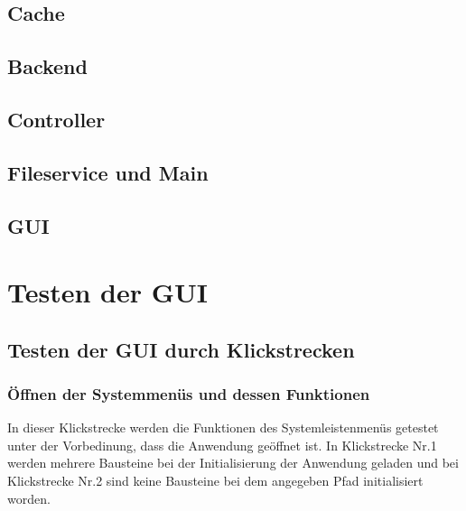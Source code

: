 \documentclass[parskip=full]{scrartcl}
\begin{document}
\subsection{Cache}
\subsection{Backend}
\subsection{Controller}
\subsection{Fileservice und Main}
\subsection{GUI}

\clearpage
\section{Testen der GUI} \label{gui}


\subsection{Testen der GUI durch Klickstrecken}

\subsubsection{Öffnen der Systemmenüs und dessen Funktionen}

In dieser Klickstrecke werden die Funktionen des Systemleistenmenüs getestet unter der Vorbedinung, dass die Anwendung geöffnet ist. In Klickstrecke Nr.1 werden mehrere Bausteine bei der Initialisierung der Anwendung geladen und bei Klickstrecke Nr.2 sind keine Bausteine bei dem angegeben Pfad initialisiert worden. 
\end{document}
